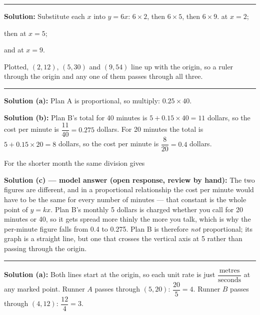 \documentclass[12pt]{article}
\begin{document}
\vspace{0.2cm}\noindent\rule{\linewidth}{0.2pt}


\textbf{Solution:} Substitute each $x$ into $y = 6x$:
$6 \times 2$, then $6 \times 5$, then $6 \times 9$.
 \quad at $x = 2$;

then  \quad at $x = 5$;

and  \quad at $x = 9$.

Plotted, $(2,12)$, $(5,30)$ and $(9,54)$ line up with the origin, so a ruler through
the origin and any one of them passes through all three.

\vspace{0.2cm}\noindent\rule{\linewidth}{0.2pt}


\textbf{Solution (a):} Plan A is proportional, so multiply:
$0.25 \times 40$.

\textbf{Solution (b):} Plan B's total for 40 minutes is
$5 + 0.15 \times 40 = 11$ dollars, so the cost per minute is
$\dfrac{11}{40} = 0.275$ dollars. For 20 minutes the total is
$5 + 0.15 \times 20 = 8$ dollars, so the cost per minute is
$\dfrac{8}{20} = 0.4$ dollars.

For the shorter month the same division gives 

\textbf{Solution (c) --- model answer (open response, review by hand):}
The two figures are different, and in a proportional relationship the cost per
minute would have to be the same for every number of minutes --- that constant is
the whole point of $y = kx$. Plan B's monthly 5 dollars is charged whether you call
for 20 minutes or 40, so it gets spread more thinly the more you talk, which is why
the per-minute figure falls from 0.4 to 0.275. Plan B is therefore \emph{not}
proportional; its graph is a straight line, but one that crosses the vertical axis
at 5 rather than passing through the origin.

\vspace{0.2cm}\noindent\rule{\linewidth}{0.2pt}


\textbf{Solution (a):} Both lines start at the origin, so each unit rate is just
$\dfrac{\text{metres}}{\text{seconds}}$ at any marked point. Runner $A$ passes
through $(5, 20)$: $\dfrac{20}{5} = 4$. Runner $B$ passes through $(4, 12)$:
$\dfrac{12}{4} = 3$.
\end{document}
